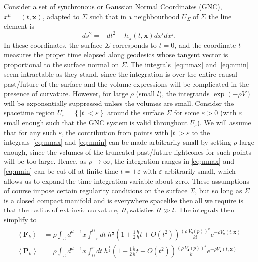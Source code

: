 \documentclass[12pt]{article}
\newcommand{\be}{\begin{equation}}
\newcommand{\ee}{\end{equation}}
\newcommand{\BF}[1]{\mathbf{F}_{#1}}
\newcommand{\BP}[1]{\mathbf{P}_{#1}}
\newcommand{\mb}[1]{\marginnote{\texttt{\small MB:\,#1}}}
\begin{document}
Consider a set of synchronous or Gaussian Normal Coordinates (GNC), $x^\mu= (t,\mathbf x)$, adapted to $\Sigma$ such that in a neighbourhood $U_\Sigma$ of $\Sigma$ the line element is
\be
ds^2 = -dt^2 + h_{ij} (t,\mathbf x) dx^i dx^j.
\ee
In these coordinates, the surface $\Sigma$ corresponds to $t=0$, and the coordinate $t$ measures the proper time elapsed along geodesics whose tangent vector is proportional to the surface normal on $\Sigma$.
The integrals~\eqref{eq:nmax} and~\eqref{eq:nmin} seem intractable as they stand, since the integration is over the entire causal past/future of the surface and the volume expressions will be complicated in the presence of curvature. However, for large $\rho$ (small $l$), the integrands $\exp (-\rho V)$ will be exponentially suppressed unless the volumes are small. Consider the spacetime region $U_\varepsilon=\left\{|t|<\varepsilon\right\}$ around the surface $\Sigma$ for some $\varepsilon>0$ (with $\varepsilon$ small enough such that the GNC system is valid throughout $U_\varepsilon$). We will assume that for any such $\varepsilon$, the contribution from points with $|t|>\varepsilon$ to the integrals~\eqref{eq:nmax} and \eqref{eq:nmin} can be made arbitrarily small by setting $\rho$ large enough, since the volumes of the truncated past/future lightcones for such points will be too large. Hence, as $\rho\rightarrow\infty$, the integration ranges in \eqref{eq:nmax} and \eqref{eq:nmin} can be cut off at finite time $t=\pm\varepsilon$ with $\varepsilon$ arbitrarily small, which allows us to expand the time integration-variable about zero. These assumptions of course impose certain regularity conditions on the surface $\Sigma$, but so long as $\Sigma$ is a closed compact manifold and is everywhere spacelike then all we require is that the radius of extrinsic curvature, $R$, satisfies $R\gg l$. The integrals then simplify to
\begin{gather}\label{eq:nmax_and_eq:nmin}
\begin{aligned}
\left\langle \BF{k}\right\rangle & =\rho \int_{\Sigma}d^{d-1}x\int_{-\varepsilon}^{0}dt\:
h^{\frac{1}{2}}\left (1+
\frac{1}{2}\frac{\dot{h}}{h}t+O (t^2)\right)
 \frac{\left (\rho\: V_\blacktriangledown (p)\right)^k}{k!} e^{-\rho V_\blacktriangledown (t,\mathbf x)}
\\
\left\langle \BP{k}\right\rangle & =\rho \int_{\Sigma}d^{d-1}x\int_{0}^{\varepsilon}dt\:
h^{\frac{1}{2}}\left (1+
\frac{1}{2}\frac{\dot{h}}{h}t+O (t^2)\right) \frac{\left (\rho\: V_\blacktriangle (p)\right)^k}{k!} e^{-\rho V_\blacktriangle (t,\mathbf x)}
\end{aligned}
\end{gather}
\end{document}

